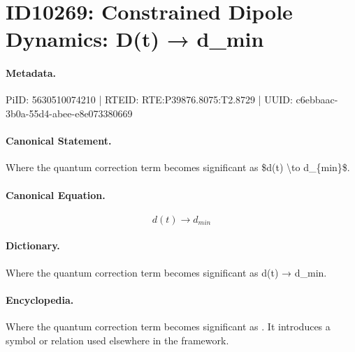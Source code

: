 \section*{ID10269: Constrained Dipole Dynamics: D(t) → d\_min}
\paragraph{Metadata.}
PiID: 5630510074210 | RTEID: RTE:P39876.8075:T2.8729 | UUID: c6ebbaac-3b0a-55d4-abee-e8e073380669

\paragraph{Canonical Statement.}
Where the quantum correction term becomes significant as \$d(t) \textbackslash{}to d\_\{min\}\$.

\paragraph{Canonical Equation.}
\[
d(t) \to d_{min}
\]

\paragraph{Dictionary.}
Where the quantum correction term becomes significant as d(t) → d\_min.

\paragraph{Encyclopedia.}
Where the quantum correction term becomes significant as . It introduces a symbol or relation used elsewhere in the framework.
